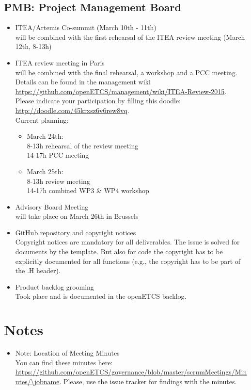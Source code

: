 \documentclass[a4paper, 11pt]{article}
\begin{document}
\subsection{PMB: Project Management Board}
\begin{itemize}
\item ITEA/Artemis Co-summit (March 10th - 11th)\\
will be combined with the first rehearsal of the ITEA review meeting (March 12th, 8-13h)

\item ITEA review meeting in Paris\\
will be combined with the final rehearsal, a workshop and a PCC meeting. Details can be found in the management wiki \url{https://github.com/openETCS/management/wiki/ITEA-Review-2015}.\\
Please indicate your participation by filling this doodle: \url{http://doodle.com/45krxsz6v6rew8vq}.\\
Current planning:\\
\begin{itemize}
\item March 24th:\\
8-13h rehearsal of the review meeting\\
14-17h PCC meeting\\
\item March 25th:\\
8-13h review meeting\\
14-17h combined WP3 \& WP4 workshop \\
\end{itemize}
\item Advisory Board Meeting\\
will take place on March 26th in Brussels

\item GitHub repository and copyright notices\\
Copyright notices are mandatory for all deliverables. The issue is solved for documents by the template. But also for code the copyright has to be explicitly documented for all functions (e.g., the copyright has to be part of the .H header). 

\item Product backlog grooming\\
Took place and is documented in the openETCS backlog.


\end{itemize}

\section{Notes}
\begin{itemize}

\item Note: Location of Meeting Minutes\\
You can find these minutes here: \url{https://github.com/openETCS/governance/blob/master/scrumMeetings/Minutes/\jobname}. Please, use the issue tracker for findings with the minutes.

\end{itemize}
\end{document}
